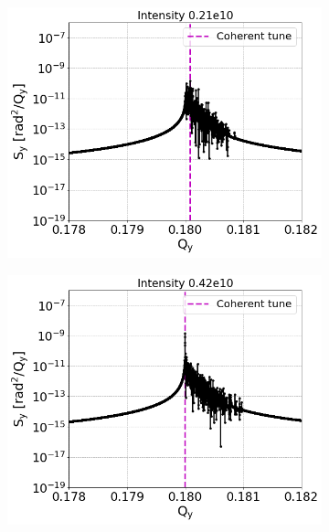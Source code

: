 \begin{figure}[htp]
    \centering
    \begin{subfigure}{.45\textwidth}
        \centering
        \includegraphics[width=.95\linewidth]{images/Ch7/psdY_intensity0.21e10.png}  
        \label{fig:study_9a}
    \end{subfigure}
    \begin{subfigure}{.45\textwidth}
        \centering
        \includegraphics[width=.95\linewidth]{images/Ch7/psdY_intensity0.42e10.png}
        \label{fig:study_9b}

\end{subfigure}
\end{figure}
